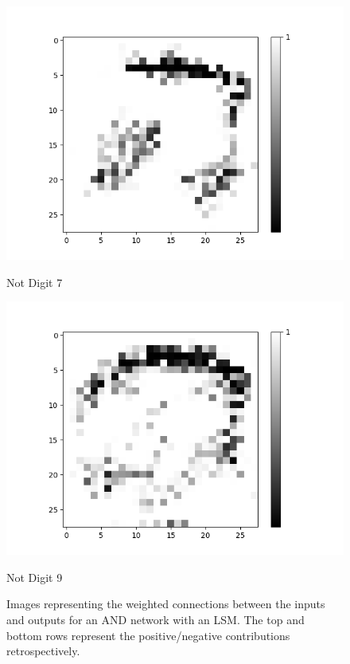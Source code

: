 \begin{figure}[H]
\begin{minipage}[b]{0.19\textwidth}
		\includegraphics[width=\textwidth]{AND(LSM)/Negative/Layer0-Neuron-7.png}
		\caption{Not Digit 7}
	\end{minipage}
	\begin{minipage}[b]{0.19\textwidth}
		\captionsetup{labelformat=empty}
		\includegraphics[width=\textwidth]{AND(LSM)/Negative/Layer0-Neuron-9.png}
		\caption{Not Digit 9}
	\end{minipage}
	\hfill
	\caption{Images representing the weighted connections between the inputs and outputs for an AND network with an LSM. The top and bottom rows represent the positive/negative contributions retrospectively.}
	\label{fig:and-net-new-archetchure-with-lsm-interp}
\end{figure}


